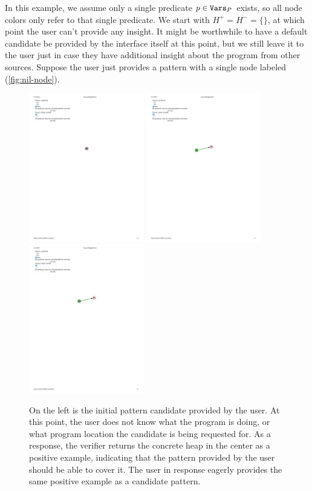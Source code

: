 In this example, we assume only a single predicate $p \in \mathtt{Vars}_P$ exists, so all node colors only refer to that single predicate. We start with $H^{+} = H^{-} = \{\}$, at which point the user can't provide any insight. It might be worthwhile to have a default candidate be provided by the interface itself at this point, but we still leave it to the user just in case they have additional insight about the program from other sources. Suppose the user just provides a pattern with a single node labeled \nilconst (\autoref{fig:nil-node}).

\begin{figure}
  \centering
  \includegraphics[width=5cm]{fig/just-nil.pdf}
  \includegraphics[width=5cm]{fig/positive1.pdf}
  \includegraphics[width=5cm]{fig/positive1.pdf}
  \caption{On the left is the initial pattern candidate provided by the user. At this point, the user does not know what the program is doing, or what program location the candidate is being requested for. As a response, the verifier returns the concrete heap in the center as a positive example, indicating that the pattern provided by the user should be able to cover it. The user in response eagerly provides the same positive example as a candidate pattern.}
  \label{fig:nil-node}
\end{figure}

